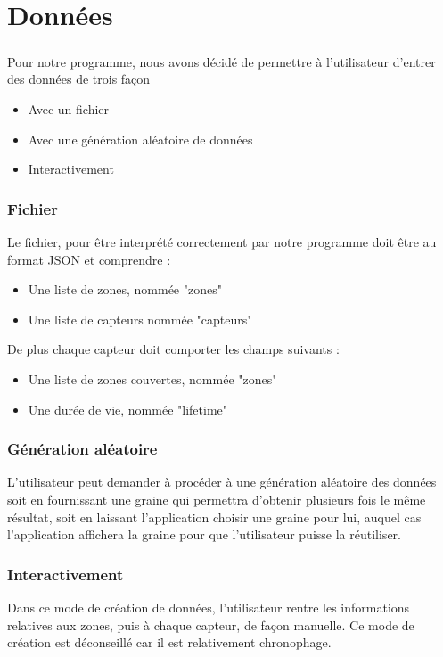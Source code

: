 \chapter{Données}

\paragraph{}
    Pour notre programme, nous avons décidé de permettre à l'utilisateur
    d'entrer des données de trois façon
    \begin{itemize}
        \item Avec un fichier
        \item Avec une génération aléatoire de données
        \item Interactivement
    \end{itemize}

    \subsection{Fichier}
        Le fichier, pour être interprété correctement par notre programme
        doit être au format JSON et comprendre :
        \begin{itemize}
            \item Une liste de zones, nommée "zones"
            \item Une liste de capteurs nommée "capteurs"
        \end{itemize}
        De plus chaque capteur doit comporter les champs suivants :
        \begin{itemize}
            \item Une liste de zones couvertes, nommée "zones"
            \item Une durée de vie, nommée "lifetime"
        \end{itemize}

    \subsection{Génération aléatoire}
        L'utilisateur peut demander à procéder à une génération aléatoire des
        données soit en fournissant une graine qui permettra d'obtenir plusieurs
        fois le même résultat, soit en laissant l'application choisir une graine
        pour lui, auquel cas l'application affichera la graine pour que
        l'utilisateur puisse la réutiliser.


    \subsection{Interactivement}
        Dans ce mode de création de données, l'utilisateur rentre les
        informations relatives aux zones, puis à chaque capteur, de façon
        manuelle. Ce mode de création est déconseillé car il est relativement
        chronophage.
